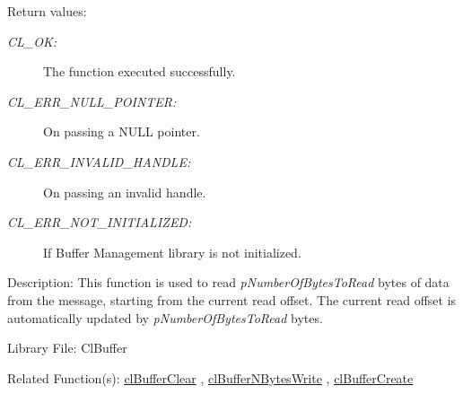 \begin{Desc}
\item[Return values:]
\begin{description}
\item[{\em CL\_\-OK:}]The function executed successfully. 
\item[{\em CL\_\-ERR\_\-NULL\_\-POINTER:}]On passing a NULL pointer. 
\item[{\em CL\_\-ERR\_\-INVALID\_\-HANDLE:}]On passing an invalid handle. 
\item[{\em CL\_\-ERR\_\-NOT\_\-INITIALIZED:}]If Buffer Management library is not initialized.\end{description}
\end{Desc}
\begin{Desc}
\item[Description:]This function is used to read {\em p\-Number\-Of\-Bytes\-To\-Read\/} bytes of data from the message, starting from the 
current read offset. The current read offset is automatically updated by {\em p\-Number\-Of\-Bytes\-To\-Read\/} bytes.\end{Desc}
\begin{Desc}
\item[Library File:]Cl\-Buffer\end{Desc}
\begin{Desc}
\item[Related Function(s):]\hyperlink{pagebuf106}{cl\-Buffer\-Clear} , \hyperlink{pagebuf109}{cl\-Buffer\-NBytes\-Write} , 
\hyperlink{pagebuf103}{cl\-Buffer\-Create} \end{Desc}


\newpage
